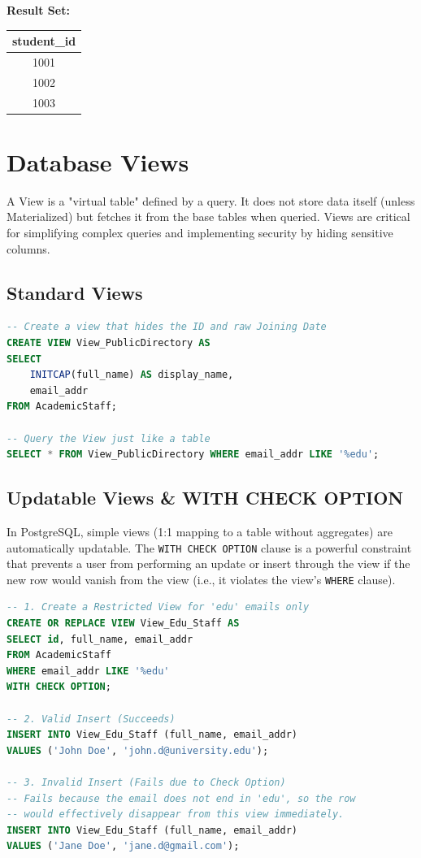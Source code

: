 \documentclass[12pt,a4paper]{article}
\begin{document}
\textbf{Result Set:}
\begin{table}[H]
\centering
\begin{tabular}{@{}c@{}}
\toprule
\textbf{student\_id} \\ \midrule
1001 \\
1002 \\
1003 \\ \bottomrule
\end{tabular}
\end{table}

\newpage
\section{Database Views}
A View is a "virtual table" defined by a query. It does not store data itself (unless Materialized) but fetches it from the base tables when queried. Views are critical for simplifying complex queries and implementing security by hiding sensitive columns.

\subsection{Standard Views}
\begin{lstlisting}[language=SQL]
-- Create a view that hides the ID and raw Joining Date
CREATE VIEW View_PublicDirectory AS
SELECT 
    INITCAP(full_name) AS display_name, 
    email_addr 
FROM AcademicStaff;

-- Query the View just like a table
SELECT * FROM View_PublicDirectory WHERE email_addr LIKE '%edu';
\end{lstlisting}

\subsection{Updatable Views \& WITH CHECK OPTION}
In PostgreSQL, simple views (1:1 mapping to a table without aggregates) are automatically updatable. The \texttt{WITH CHECK OPTION} clause is a powerful constraint that prevents a user from performing an update or insert through the view if the new row would vanish from the view (i.e., it violates the view's \texttt{WHERE} clause).

\begin{lstlisting}[language=SQL]
-- 1. Create a Restricted View for 'edu' emails only
CREATE OR REPLACE VIEW View_Edu_Staff AS
SELECT id, full_name, email_addr
FROM AcademicStaff
WHERE email_addr LIKE '%edu'
WITH CHECK OPTION;

-- 2. Valid Insert (Succeeds)
INSERT INTO View_Edu_Staff (full_name, email_addr) 
VALUES ('John Doe', 'john.d@university.edu');

-- 3. Invalid Insert (Fails due to Check Option)
-- Fails because the email does not end in 'edu', so the row 
-- would effectively disappear from this view immediately.
INSERT INTO View_Edu_Staff (full_name, email_addr) 
VALUES ('Jane Doe', 'jane.d@gmail.com');
\end{lstlisting}
\end{document}
